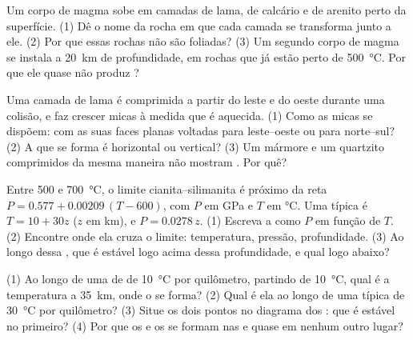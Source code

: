 \begin{exercise}[$\star\star$]\label{exo:g12:metamorphic-rocks:10}
Um corpo de magma sobe em camadas de lama, de calcário e de arenito perto da
superfície. (1) Dê o nome da rocha em que cada camada se transforma junto a
ele. (2) Por que essas rochas não são foliadas? (3) Um segundo corpo de
magma se instala a \qty{20}{km} de profundidade, em rochas que já estão
perto de \qty{500}{\celsius}. Por que ele quase não produz ?
\end{exercise}

\begin{exercise}[$\star\star$]\label{exo:g12:metamorphic-rocks:11}
Uma camada de lama é comprimida a partir do leste e do oeste durante uma
colisão, e faz crescer micas à medida que é aquecida. (1) Como as micas se
dispõem: com as suas faces planas voltadas para leste--oeste ou para
norte--sul? (2) A  que se forma é horizontal ou vertical? (3) Um
mármore e um quartzito comprimidos da mesma maneira não mostram .
Por quê?
\end{exercise}

\begin{exercise}[$\star\star\star$]\label{exo:g12:metamorphic-rocks:12}
Entre 500 e \qty{700}{\celsius}, o limite cianita--silimanita é próximo da
reta $P = 0.577 + 0.00209\,(T - 600)$, com $P$ em
\unit{GPa} e $T$ em \unit{\celsius}. Uma  típica é $T = 10 + 30z$
($z$ em \unit{km}), e $P = 0.0278\,z$. (1) Escreva a  como $P$ em
função de $T$. (2) Encontre onde ela cruza o limite: temperatura, pressão,
profundidade. (3) Ao longo dessa , que  é estável logo
acima dessa profundidade, e qual logo abaixo?
\end{exercise}

\begin{exercise}[$\star\star\star$]\label{exo:g12:metamorphic-rocks:13}
(1) Ao longo de uma  de  de \qty{10}{\celsius} por
quilômetro, partindo de \qty{10}{\celsius}, qual é a temperatura a
\qty{35}{km}, onde o  se forma? (2) Qual é ela ao longo de uma
 típica de \qty{30}{\celsius} por quilômetro? (3) Situe os dois
pontos no diagrama dos : que  é estável no primeiro?
(4) Por que os  e os  se formam nas 
e quase em nenhum outro lugar?
\end{exercise}

